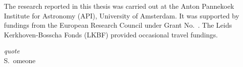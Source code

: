 {\small The research reported in this thesis was carried out at the Anton
  Pannekoek Institute for Astronomy (API), University of Amsterdam. It was supported by fundings from the European Research Council under Grant No.~. The Leids Kerkhoven-Bosscha Fonds
  (LKBF) provided occasional travel fundings.} \vspace{0.5em}

\clearpage

\thispagestyle{empty}
\null\vfill\null
\hfill\parbox{110mm}{
  \raggedleft
    \emph{\large quote}\\[5pt]
  S.~omeone
}
\null\vfill\null
\clearpage
\thispagestyle{empty}
\newpage
\phantom{let's kill those trees}

\pagestyle{fancy}
\setlength\parindent{15pt}


